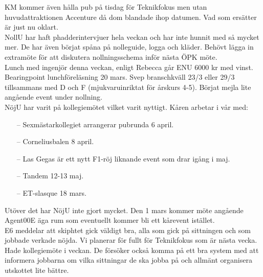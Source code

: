 \documentclass[10pt]{article}
\begin{document}
\begin{paragrafer}
\begin{paragrafer}
KM kommer även hålla pub på tisdag för Teknikfokus men utan huvudattraktionen Accenture då dom blandade ihop datumen. Vad som ersätter är just nu oklart.\\

NollU har haft phadderintervjuer hela veckan och har inte hunnit med så mycket mer. De har även börjat spåna på nolleguide, logga och kläder. Behövt lägga in extramöte för att diskutera nollningsschema inför nästa ÖPK möte.\\

Lunch med ingenjör denna veckan, enligt Rebecca går ENU 6000 kr med vinst. Bearingpoint lunchföreläsning 20 mars. Svep branschkväll 23/3 eller 29/3 tillsammans med D och F (mjukvaruinriktat för årskurs 4-5). Börjat mejla lite angående event under nollning.\\

NöjU har varit på kollegiemötet vilket varit nyttigt. Kåren arbetar i vår med:
\begin{itemize}
  \item [--] Sexmästarkollegiet arrangerar pubrunda 6 april.
  \item [--] Corneliusbalen 8 april.
  \item [--] Las Gegas är ett nytt F1-röj liknande event som drar igång i maj.
  \item [--] Tandem 12-13 maj.
  \item [--] ET-slasque 18 mars.
\end{itemize}
Utöver det har NöjU inte gjort mycket. Den 1 mars kommer möte angående Agent00E äga rum som eventuellt kommer bli ett kårevent istället. \\

E6 meddelar att skiphtet gick väldigt bra, alla som gick på sittningen och som jobbade verkade nöjda. Vi planerar för fullt för Teknikfokus som är nästa vecka.
Hade kollegiemöte i veckan.
De försöker också komma på ett bra system med att informera jobbarna om vilka sittningar de ska jobba på och allmänt organisera utskottet lite bättre.\\


\end{paragrafer}
\end{paragrafer}
\end{document}
